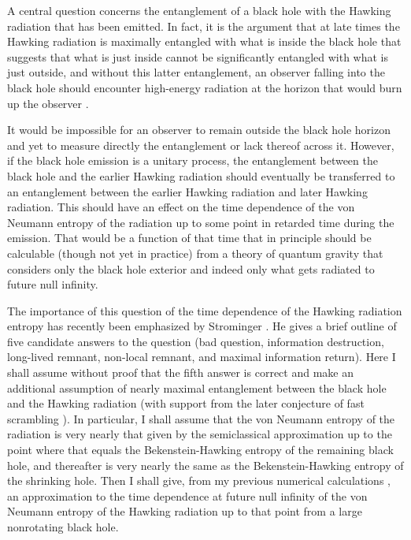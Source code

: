 \documentclass[12pt]{article}
\begin{document}
A central question concerns the entanglement of a black hole with the Hawking radiation \cite{Hawking:1974rv,Hawking:1974sw} that has been emitted.  In fact, it is the argument that at late times the Hawking radiation is maximally entangled with what is inside the black hole that suggests that what is just inside cannot be significantly entangled with what is just outside, and without this latter entanglement, an observer falling into the black hole should encounter high-energy radiation at the horizon that would burn up the observer \cite{AMPS}.

It would be impossible for an observer to remain outside the black hole horizon and yet to measure directly the entanglement or lack thereof across it.  However, if the black hole emission is a unitary process, the entanglement between the black hole and the earlier Hawking radiation should eventually be transferred to an entanglement between the earlier Hawking radiation and later Hawking radiation.  This should have an effect on the time dependence of the von Neumann entropy of the radiation up to some point in retarded time during the emission.  That would be a function of that time that in principle should be calculable (though not yet in practice) from a theory of quantum gravity that considers only the black hole exterior and indeed only what gets radiated to future null infinity.

The importance of this question of the time dependence of the Hawking radiation entropy has recently been emphasized by Strominger \cite{Strominger:2009aj}.  He gives a brief outline of five candidate answers to the question (bad question, information destruction, long-lived remnant, non-local remnant, and maximal information return).  Here I shall assume without proof that the fifth answer is correct and make an additional assumption of nearly maximal entanglement between the black hole and the Hawking radiation \cite{Page:1993df,Page:1993wv} (with support from the later conjecture of fast scrambling \cite{Sekino:2008he, Susskind:2011ap,Lashkari:2011yi,Edalati:2012jj,Barbon:2012zv}).  In particular, I shall assume that the von Neumann entropy of the radiation is very nearly that given by the semiclassical approximation up to the point where that equals the Bekenstein-Hawking entropy of the remaining black hole, and thereafter is very nearly the same as the Bekenstein-Hawking entropy of the shrinking hole.  Then I shall give, from my previous numerical calculations \cite{Page:1976df,Page:1976ki,Page:1977um}, an approximation to the time dependence at future null infinity of the von Neumann entropy of the Hawking radiation up to that point from a large nonrotating black hole. 
\end{document}
